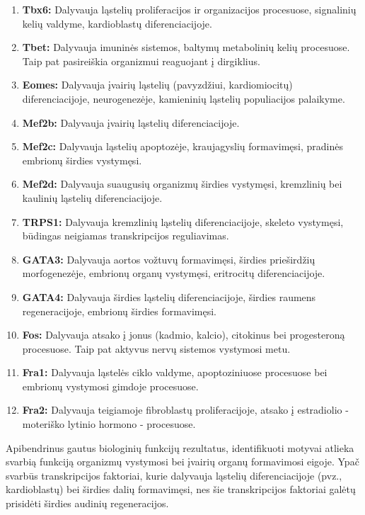 \documentclass[12pt]{article}
\begin{document}
\begin{enumerate}
    \item \textbf{Tbx6:} Dalyvauja ląstelių proliferacijos ir organizacijos
        procesuose, signalinių kelių valdyme, kardioblastų diferenciacijoje.
    \item \textbf{Tbet:} Dalyvauja imuninės sistemos, baltymų metabolinių
        kelių procesuose. Taip pat pasireiškia organizmui reaguojant į
        dirgiklius.
    \item \textbf{Eomes:} Dalyvauja įvairių ląstelių (pavyzdžiui,
        kardiomiocitų) diferenciacijoje, neurogenezėje, kamieninių ląstelių
        populiacijos palaikyme.
    \item \textbf{Mef2b:} Dalyvauja įvairių ląstelių diferenciacijoje.
    \item \textbf{Mef2c:} Dalyvauja ląstelių apoptozėje, kraujagyslių
        formavimęsi, pradinės embrionų širdies vystymęsi.
    \item \textbf{Mef2d:} Dalyvauja suaugusių organizmų širdies vystymęsi,
        kremzlinių bei kaulinių ląstelių diferenciacijoje.
    \item \textbf{TRPS1:} Dalyvauja kremzlinių ląstelių diferenciacijoje,
        skeleto vystymęsi, būdingas neigiamas transkripcijos reguliavimas.
    \item \textbf{GATA3:} Dalyvauja aortos vožtuvų formavimęsi, širdies
        prieširdžių morfogenezėje, embrionų organų vystymęsi, eritrocitų
        diferenciacijoje.
    \item \textbf{GATA4:} Dalyvauja širdies ląstelių diferenciacijoje,
        širdies raumens regeneracijoje, embrionų širdies formavimęsi.
    \item \textbf{Fos:} Dalyvauja atsako į jonus (kadmio, kalcio),
        citokinus bei progesteroną procesuose. Taip pat aktyvus nervų sistemos
        vystymosi metu.
    \item \textbf{Fra1:} Dalyvauja ląstelės ciklo valdyme, apoptoziniuose
        procesuose bei embrionų vystymosi gimdoje procesuose.
    \item \textbf{Fra2:} Dalyvauja teigiamoje fibroblastų proliferacijoje,
        atsako į estradiolio - moteriško lytinio hormono - procesuose.
\end{enumerate}

Apibendrinus gautus biologinių funkcijų rezultatus, identifikuoti motyvai
atlieka svarbią funkciją organizmų vystymosi bei įvairių organų formavimosi
eigoje. Ypač svarbūs transkripcijos faktoriai, kurie dalyvauja ląstelių
diferenciacijoje (pvz., kardioblastų) bei širdies dalių formavimęsi, nes šie
transkripcijos faktoriai galėtų prisidėti širdies audinių regeneracijos.
\end{document}
